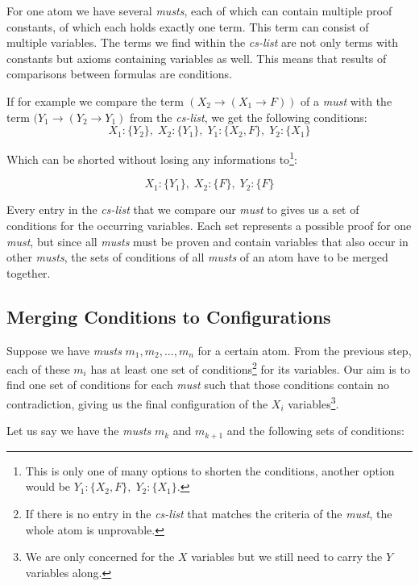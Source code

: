 For one atom we have several \emph{musts}, each of which can contain multiple proof constants, of which each holds exactly one term. This term can consist of multiple variables. The terms we find within the \emph{cs-list} are not only terms with constants but axioms containing variables as well. This means that results of comparisons between formulas are conditions. 

If for example we compare the term $(X_2 \rightarrow (X_1 \rightarrow F))$ of a \emph{must} with the term $(Y_1 \rightarrow (Y_2 \rightarrow Y_1)$ from the \emph{cs-list}, we get the following conditions:
\begin{equation*}
	X_1 : \{Y_2\},\; X_2 : \{Y_1\},\; Y_1 : \{X_2, F\},\; Y_2 : \{X_1\} 
\end{equation*}

Which can be shorted without losing any informations to\footnote{This is only one of many options to shorten the conditions, another option would be $Y_1: \{X_2, F\},\; Y_2:\{X_1\}$.}:

\begin{equation*}
	X_1 : \{Y_1\},\; X_2 : \{F\},\; Y_2 : \{F\}
\end{equation*}

Every entry in the \emph{cs-list} that we compare our \emph{must} to gives us a set of conditions for the occurring variables. Each set represents a possible proof for one \emph{must}, but since all \emph{musts} must be proven and contain variables that also occur in other \emph{musts}, the sets of conditions of all \emph{musts} of an atom have to be merged together.

\subsection{Merging Conditions to Configurations}
Suppose we have \emph{musts} $m_1, m_2, \dots, m_n$ for a certain atom. From the previous step, each of these $m_i$ has at least one set of conditions\footnote{If there is no entry in the \emph{cs-list} that matches the criteria of the \emph{must}, the whole atom is unprovable.} for its variables. Our aim is to find one set of conditions for each \emph{must} such that those conditions contain no contradiction, giving us the final configuration of the $X_i$ variables\footnote{We are only concerned for the $X$ variables but we still need to carry the $Y$ variables along.}.

Let us say we have the \emph{musts} $m_k$ and $m_{k+1}$ and the following sets of conditions: 

